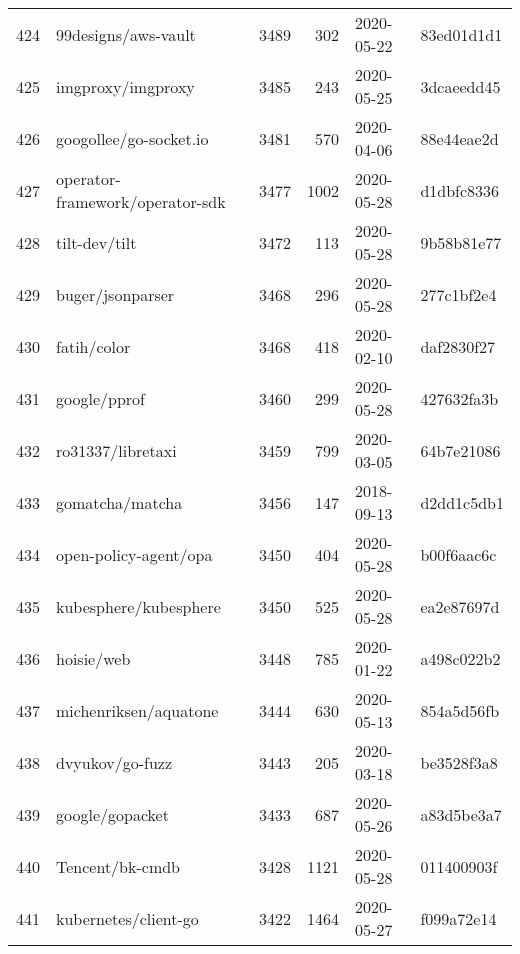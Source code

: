 \begin{longtable}{llrrll}
    424 &                                99designs/aws-vault &   3489 &    302 & 2020-05-22 &  83ed01d1d1 \\
    425 &                                  imgproxy/imgproxy &   3485 &    243 & 2020-05-25 &  3dcaeedd45 \\
    426 &                             googollee/go-socket.io &   3481 &    570 & 2020-04-06 &  88e44eae2d \\
    427 &                    operator-framework/operator-sdk &   3477 &   1002 & 2020-05-28 &  d1dbfc8336 \\
    428 &                                      tilt-dev/tilt &   3472 &    113 & 2020-05-28 &  9b58b81e77 \\
    429 &                                   buger/jsonparser &   3468 &    296 & 2020-05-28 &  277c1bf2e4 \\
    430 &                                        fatih/color &   3468 &    418 & 2020-02-10 &  daf2830f27 \\
    431 &                                       google/pprof &   3460 &    299 & 2020-05-28 &  427632fa3b \\
    432 &                                  ro31337/libretaxi &   3459 &    799 & 2020-03-05 &  64b7e21086 \\
    433 &                                    gomatcha/matcha &   3456 &    147 & 2018-09-13 &  d2dd1c5db1 \\
    434 &                              open-policy-agent/opa &   3450 &    404 & 2020-05-28 &  b00f6aac6c \\
    435 &                              kubesphere/kubesphere &   3450 &    525 & 2020-05-28 &  ea2e87697d \\
    436 &                                         hoisie/web &   3448 &    785 & 2020-01-22 &  a498c022b2 \\
    437 &                              michenriksen/aquatone &   3444 &    630 & 2020-05-13 &  854a5d56fb \\
    438 &                                    dvyukov/go-fuzz &   3443 &    205 & 2020-03-18 &  be3528f3a8 \\
    439 &                                    google/gopacket &   3433 &    687 & 2020-05-26 &  a83d5be3a7 \\
    440 &                                    Tencent/bk-cmdb &   3428 &   1121 & 2020-05-28 &  011400903f \\
    441 &                               kubernetes/client-go &   3422 &   1464 & 2020-05-27 &  f099a72e14 \\

\end{longtable}
